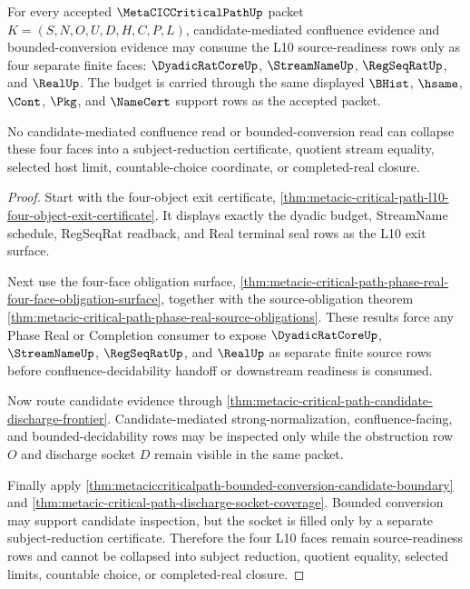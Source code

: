 \begin{theorem}
\label{thm:metacic-critical-path-four-face-confluence-budget}
For every accepted $\MetaCICCriticalPathUp$ packet $K=(S,N,O,U,D,H,C,P,L)$, candidate-mediated confluence evidence and bounded-conversion evidence may consume the L10 source-readiness rows only as four separate finite faces: $\DyadicRatCoreUp$, $\StreamNameUp$, $\RegSeqRatUp$, and $\RealUp$. The budget is carried through the same displayed $\BHist$, $\hsame$, $\Cont$, $\Pkg$, and $\NameCert$ support rows as the accepted packet.

No candidate-mediated confluence read or bounded-conversion read can collapse these four faces into a subject-reduction certificate, quotient stream equality, selected host limit, countable-choice coordinate, or completed-real closure.
\end{theorem}
\begin{proof}
Start with the four-object exit certificate, \autoref{thm:metacic-critical-path-l10-four-object-exit-certificate}. It displays exactly the dyadic budget, StreamName schedule, RegSeqRat readback, and Real terminal seal rows as the L10 exit surface.

Next use the four-face obligation surface, \autoref{thm:metacic-critical-path-phase-real-four-face-obligation-surface}, together with the source-obligation theorem \autoref{thm:metacic-critical-path-phase-real-source-obligations}. These results force any Phase Real or Completion consumer to expose $\DyadicRatCoreUp$, $\StreamNameUp$, $\RegSeqRatUp$, and $\RealUp$ as separate finite source rows before confluence-decidability handoff or downstream readiness is consumed.

Now route candidate evidence through \autoref{thm:metacic-critical-path-candidate-discharge-frontier}. Candidate-mediated strong-normalization, confluence-facing, and bounded-decidability rows may be inspected only while the obstruction row $O$ and discharge socket $D$ remain visible in the same packet.

Finally apply \autoref{thm:metaciccriticalpath-bounded-conversion-candidate-boundary} and \autoref{thm:metacic-critical-path-discharge-socket-coverage}. Bounded conversion may support candidate inspection, but the socket is filled only by a separate subject-reduction certificate. Therefore the four L10 faces remain source-readiness rows and cannot be collapsed into subject reduction, quotient equality, selected limits, countable choice, or completed-real closure.
\end{proof}

